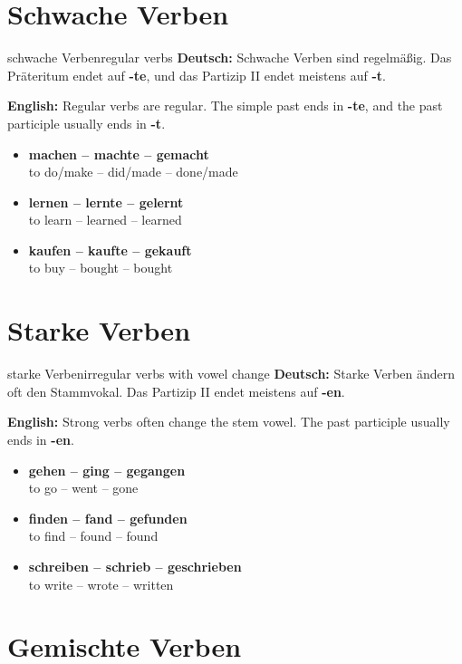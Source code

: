 \documentclass[a4paper,11pt]{article}
\newcommand{\GermanText}[1]{\textbf{Deutsch: }#1\par}
\newcommand{\EnglishText}[1]{{\small\color{SoftGray}\textbf{English: }#1\par}}
\newcommand{\ExampleItem}[2]{\item \textbf{#1}\\{\small\color{SoftGray}#2}}
\begin{document}
\section{Schwache Verben}

\begin{grammarentry}{schwache Verben}{regular verbs}
\GermanText{Schwache Verben sind regelmäßig. Das Präteritum endet auf \textbf{-te}, und das Partizip II endet meistens auf \textbf{-t}.}
\EnglishText{Regular verbs are regular. The simple past ends in \textbf{-te}, and the past participle usually ends in \textbf{-t}.}

\begin{exbox}
\begin{itemize}
\ExampleItem{machen -- machte -- gemacht}{to do/make -- did/made -- done/made}
\ExampleItem{lernen -- lernte -- gelernt}{to learn -- learned -- learned}
\ExampleItem{kaufen -- kaufte -- gekauft}{to buy -- bought -- bought}
\end{itemize}
\end{exbox}
\end{grammarentry}

\section{Starke Verben}

\begin{grammarentry}{starke Verben}{irregular verbs with vowel change}
\GermanText{Starke Verben ändern oft den Stammvokal. Das Partizip II endet meistens auf \textbf{-en}.}
\EnglishText{Strong verbs often change the stem vowel. The past participle usually ends in \textbf{-en}.}

\begin{exbox}
\begin{itemize}
\ExampleItem{gehen -- ging -- gegangen}{to go -- went -- gone}
\ExampleItem{finden -- fand -- gefunden}{to find -- found -- found}
\ExampleItem{schreiben -- schrieb -- geschrieben}{to write -- wrote -- written}
\end{itemize}
\end{exbox}
\end{grammarentry}

\section{Gemischte Verben}
\end{document}
